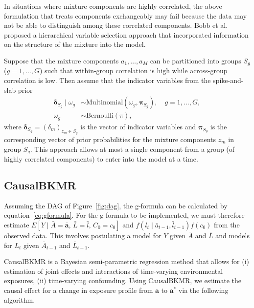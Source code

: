 In situations where mixture components are highly correlated, the above formulation that treats components exchangeably may fail because the data may not be able to distinguish among these correlated components. Bobb et al.\cite{bobb_bkmr_2015} proposed a hierarchical variable selection approach that incorporated information on the structure of the mixture into the model.

Suppose that the mixture components $a_1, \ldots, a_M$ can be partitioned into groups $S_g$ ($g = 1, \ldots, G$) such that within-group correlation is high while across-group correlation is low. Then assume that the indicator variables from the spike-and-slab prior
\begin{align*}
    \boldsymbol{\delta}_{S_g} \mid \omega_g &\sim \text{Multinomial}(\omega_g, \boldsymbol{\pi}_{S_g}), \quad g = 1, \ldots, G, \\
    \omega_g &\sim \text{Bernoulli}(\pi),
\end{align*}
where $\boldsymbol{\delta}_{S_g} = (\delta_m)_{z_m \in S_g}$ is the vector of indicator variables and $\boldsymbol{\pi}_{S_g}$ is the corresponding vector of prior probabilities for the mixture components $z_m$ in group $S_g$. This approach allows at most a single component from a group (of highly correlated components) to enter into the model at a time.

\subsection*{CausalBKMR}

Assuming the DAG of Figure~\ref{fig:dag}, the g-formula can be calculated by equation~\eqref{eq:gformula}. For the g-formula to be implemented, we must therefore estimate $E[Y \mid \bar{A} = \bar{\mathbf{a}},\, \bar{L} = \bar{l},\, C_0 = c_0]$ and $f(l_t \mid \bar{a}_{t-1}, \bar{l}_{t-1}) f(c_0)$ from the observed data. This involves postulating a model for $Y$ given $\bar{A}$ and $\bar{L}$ and models for $L_t$ given $\bar{A}_{t-1}$ and $\bar{L}_{t-1}$.

CausalBKMR is a Bayesian semi-parametric regression method that allows for (i) estimation of joint effects and interactions of time-varying environmental exposures, (ii) time-varying confounding. Using CausalBKMR, we estimate the causal effect for a change in exposure profile from $\mathbf{a}$ to $\mathbf{a}^*$ via the following algorithm.

